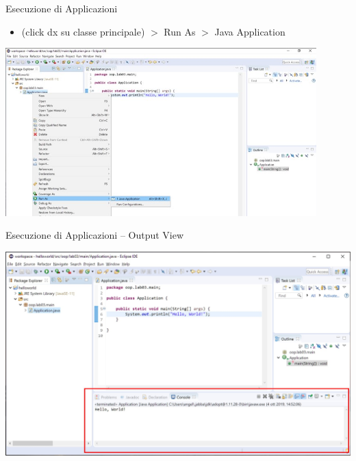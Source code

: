 \documentclass[presentation]{beamer}
\begin{document}
\begin{frame}{Esecuzione di Applicazioni}
\begin{itemize}
\item (click dx su classe principale) $>$ Run As $>$ Java Application
\end{itemize}
\begin{center}
\includegraphics[width=0.9\textwidth]{img/eclipse-screenshots/eclipse-ide-04b.jpg}
\end{center}
\end{frame}

\begin{frame}{Esecuzione di Applicazioni -- Output View}
\begin{center}
\includegraphics[width=\textwidth]{img/eclipse-screenshots/eclipse-ide-04c.jpg}
\end{center}
\end{frame}
\end{document}
